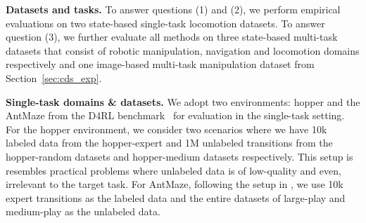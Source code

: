 \textbf{Datasets and tasks.} To answer questions (1) and (2), we perform empirical evaluations on two state-based single-task locomotion datasets. To answer question (3), we further evaluate all methods on three state-based multi-task datasets that consist of robotic manipulation, navigation and locomotion domains respectively and one image-based multi-task manipulation dataset from Section~\ref{sec:cds_exp}.


\noindent \textbf{Single-task domains \& datasets.} We adopt two environments: hopper and the AntMaze from the D4RL benchmark~\citep{fu2020d4rl} for evaluation in the single-task setting. For the hopper environment, we consider two scenarios where we have 10k labeled data from the {hopper-expert} and 1M unlabeled transitions from the {hopper-random} datasets and {hopper-medium} datasets respectively. This setup is resembles practical problems where unlabeled data is of low-quality and even, irrelevant to the target task. For AntMaze, following the setup in \cite{yang2021trail}, we use 10k expert transitions as the labeled data and the entire datasets of {large-play} and {medium-play} as the unlabeled data.



